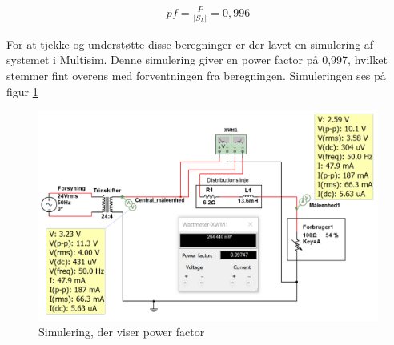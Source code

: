 \begin{align}
pf= \frac{P}{\vert S_L \vert} = 0,996
\end{align}

For at tjekke og understøtte disse beregninger er der lavet en simulering af systemet i Multisim. Denne simulering giver en power factor på 0,997, hvilket stemmer fint overens med forventningen fra beregningen. Simuleringen ses på figur \ref{fig:powfacsim} 

\begin{figure}[H] 
	\centering
	\includegraphics[width=1\textwidth]{Figure/powerfactormultisim}
	\caption{Simulering, der viser power factor}
	\label{fig:powfacsim}
\end{figure}